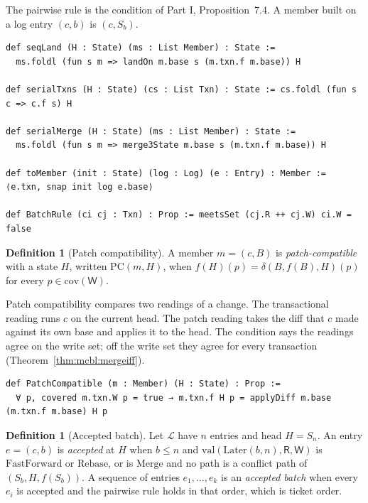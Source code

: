 \documentclass[11pt,letterpaper]{article}
\theoremstyle{definition}
\newtheorem{definition}[theorem]{Definition}
\theoremstyle{remark}
\newcommand{\R}{\mathsf{R}}
\newcommand{\W}{\mathsf{W}}
\newcommand{\Snap}[1]{S_{#1}}
\newcommand{\Log}{\mathcal{L}}
\newcommand{\Later}{\mathrm{Later}}
\newcommand{\op}[1]{\mathrm{#1}}
\newcommand{\covd}{\op{cov}}
\newcommand{\PC}{\op{PC}}
\newcommand{\val}{\op{val}}
\newcommand{\FF}{\mathrm{FastForward}}
\newcommand{\Rb}{\mathrm{Rebase}}
\newcommand{\Mg}{\mathrm{Merge}}
\begin{document}
The pairwise rule is the condition of Part I, Proposition~7.4. A member built on a log entry $(c,b)$ is $(c,\Snap{b})$.

\begin{lstlisting}[language=Lean,caption={Sequential landing, serial execution and the pairwise rule (\texttt{YonedaTx/Batch.lean})},label={lst:mcbl:serialdefs}]
def seqLand (H : State) (ms : List Member) : State :=
  ms.foldl (fun s m => landOn m.base s (m.txn.f m.base)) H

def serialTxns (H : State) (cs : List Txn) : State := cs.foldl (fun s c => c.f s) H

def serialMerge (H : State) (ms : List Member) : State :=
  ms.foldl (fun s m => merge3State m.base s (m.txn.f m.base)) H

def toMember (init : State) (log : Log) (e : Entry) : Member := ⟨e.txn, snap init log e.base⟩

def BatchRule (ci cj : Txn) : Prop := meetsSet (cj.R ++ cj.W) ci.W = false
\end{lstlisting}

\begin{definition}[Patch compatibility]
\label{def:mcbl:patchcompat}
A member $m=(c,B)$ is \emph{patch-compatible} with a state $H$, written $\PC(m,H)$, when $f(H)(p)=\delta(B,f(B),H)(p)$ for every $p\in\covd(\W)$.
\end{definition}

Patch compatibility compares two readings of a change. The transactional reading runs $c$ on the current head. The patch reading takes the diff that $c$ made against its own base and applies it to the head. The condition says the readings agree on the write set; off the write set they agree for every transaction (Theorem~\ref{thm:mcbl:mergeiff}).

\begin{lstlisting}[language=Lean,caption={Patch compatibility (\texttt{YonedaTx/Batch.lean})},label={lst:mcbl:pc}]
def PatchCompatible (m : Member) (H : State) : Prop :=
  ∀ p, covered m.txn.W p = true → m.txn.f H p = applyDiff m.base (m.txn.f m.base) H p
\end{lstlisting}

\begin{definition}[Accepted batch]
\label{def:mcbl:accepted}
Let $\Log$ have $n$ entries and head $H=\Snap{n}$. An entry $e=(c,b)$ is \emph{accepted} at $H$ when $b\leq n$ and $\val(\Later(b,n),\R,\W)$ is $\FF$ or $\Rb$, or is $\Mg$ and no path is a conflict path of $(\Snap{b},H,f(\Snap{b}))$. A sequence of entries $e_1,\dots,e_k$ is an \emph{accepted batch} when every $e_i$ is accepted and the pairwise rule holds in that order, which is ticket order.
\end{definition}
\end{document}
